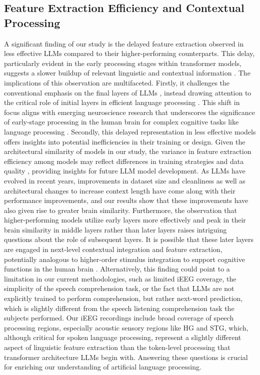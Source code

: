 \subsection{Feature Extraction Efficiency and Contextual Processing}
A significant finding of our study is the delayed feature extraction observed in less effective LLMs compared to their higher-performing counterparts. This delay, particularly evident in the early processing stages within transformer models, suggests a slower buildup of relevant linguistic and contextual information \cite{tenney2019bert}. The implications of this observation are multifaceted. Firstly, it challenges the conventional emphasis on the final layers of LLMs \cite{goldstein2022shared}, instead drawing attention to the critical role of initial layers in efficient language processing \cite{antonello2023predictive}. This shift in focus aligns with emerging neuroscience research that underscores the significance of early-stage processing in the human brain for complex cognitive tasks like language processing \cite{de2017hierarchical, keshishian2023joint, gong2023phonemic}. Secondly, this delayed representation in less effective models offers insights into potential inefficiencies in their training or design. Given the architectural similarity of models in our study, the variance in feature extraction efficiency among models may reflect differences in training strategies \cite{naveed2023comprehensive} and data quality \cite{raffel2020exploring, lee2021deduplicating, touvron2023llama2}, providing insights for future LLM model development. As LLMs have evolved in recent years, improvements in dataset size and cleanliness as well as architectural changes to increase context length have come along with their performance improvements, and our results show that these improvements have also given rise to greater brain similarity. Furthermore, the observation that higher-performing models utilize early layers more effectively and peak in their brain similarity in middle layers rather than later layers raises intriguing questions about the role of subsequent layers. It is possible that these later layers are engaged in next-level contextual integration and feature extraction, potentially analogous to higher-order stimulus integration to support cognitive functions in the human brain \cite{huth2016natural, murphy2023spatiotemporal}. Alternatively, this finding could point to a limitation in our current methodologies, such as limited iEEG coverage, the simplicity of the speech comprehension task, or the fact that LLMs are not explicitly trained to perform comprehension, but rather next-word prediction, which is slightly different from the speech listening comprehension task the subjects performed. Our iEEG recordings include broad coverage of speech processing regions, especially acoustic sensory regions like HG and STG, which, although critical for spoken language processing, represent a slightly different aspect of linguistic feature extraction than the token-level processing that transformer architecture LLMs begin with. Answering these questions is crucial for enriching our understanding of artificial language processing.

